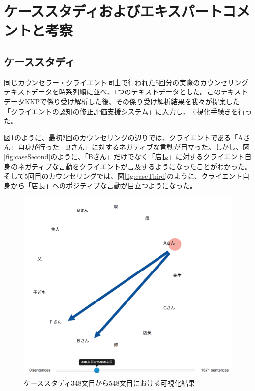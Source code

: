 \documentclass[shuuron]{kuee}
\begin{document}
\section{ケーススタディおよびエキスパートコメントと考察}

\subsection{ケーススタディ}

同じカウンセラー・クライエント同士で行われた5回分の実際のカウンセリングテキストデータを時系列順に並べ、1つのテキストデータとした。このテキストデータKNPで係り受け解析した後、その係り受け解析結果を我々が提案した「クライエントの認知の修正評価支援システム」に入力し、可視化手続きを行った。

図\ref{fig:caseFirst}のように、最初2回のカウンセリングの辺りでは、クライエントである「Aさん」自身が行った「Bさん」に対するネガティブな言動が目立った。しかし、図\ref{fig:caseSecond}のように、「Bさん」だけでなく「店長」に対するクライエント自身のネガティブな言動をクライエントが言及するようになったことがわかった。そして5回目のカウンセリングでは、図\ref{fig:caseThird}のように、クライエント自身から「店長」へのポジティブな言動が目立つようになった。


\begin{figure}
  \begin{center}
    \includegraphics[width=\linewidth]{caseFirst.png}
  \end{center}
  \caption{ケーススタディ348文目から548文目における可視化結果}
  \label{fig:caseFirst}
\end{figure}
\end{document}
